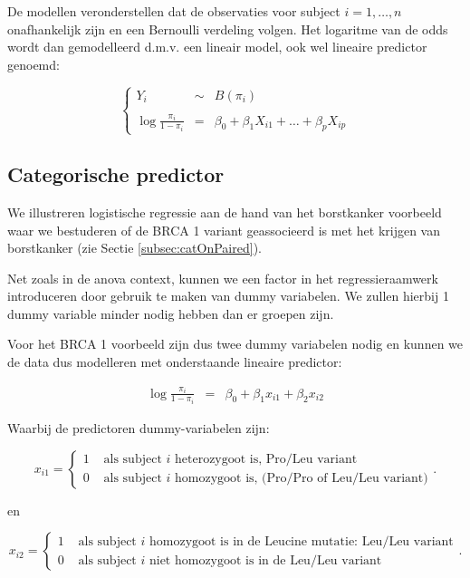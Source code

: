 \documentclass[
  12pt,dutch]{book}
\theoremstyle{definition}
\theoremstyle{definition}
\theoremstyle{definition}
\theoremstyle{definition}
\theoremstyle{remark}
\begin{document}
De modellen veronderstellen dat de observaties voor subject \(i=1,\ldots,n\) onafhankelijk zijn en een Bernoulli verdeling volgen. Het logaritme van de odds wordt dan gemodelleerd d.m.v. een lineair model, ook wel lineaire predictor genoemd:

\begin{equation}
\left\{
\begin{array}{ccl}
Y_i&\sim&B(\pi_i)\\\\
\log \frac{\pi_i}{1-\pi_i}&=&\beta_0 + \beta_1X_{i1} + \ldots + \beta_p X_{ip}
\end{array}\right.
\end{equation}

\subsection{Categorische predictor}\label{categorische-predictor}

We illustreren logistische regressie aan de hand van het borstkanker voorbeeld waar we bestuderen of de BRCA 1 variant geassocieerd is met het krijgen van borstkanker (zie Sectie \ref{subsec:catOnPaired}).

Net zoals in de anova context, kunnen we een factor in het regressieraamwerk introduceren door gebruik te maken van dummy variabelen.
We zullen hierbij 1 dummy variable minder nodig hebben dan er groepen zijn.

Voor het BRCA 1 voorbeeld zijn dus twee dummy variabelen nodig en kunnen we de data dus modelleren met onderstaande lineaire predictor:

\begin{eqnarray*}
  \log \frac{\pi_i}{1-\pi_i} &=& \beta_0+\beta_1 x_{i1} +\beta_2 x_{i2}
\end{eqnarray*}

Waarbij de predictoren dummy-variabelen zijn:

\[x_{i1} = \left\{ \begin{array}{ll}
1 & \text{ als subject $i$ heterozygoot is, Pro/Leu variant} \\
0 & \text{ als subject $i$ homozygoot is, (Pro/Pro of Leu/Leu variant)} \end{array}\right. .\]

en

\[x_{i2} = \left\{ \begin{array}{ll}
1 & \text{ als subject $i$ homozygoot is in de Leucine mutatie: Leu/Leu variant} \\
0 & \text{ als subject $i$ niet homozygoot is in de Leu/Leu variant} \end{array}\right. .\]
\end{document}
